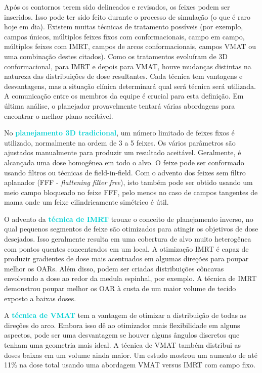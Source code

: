 \documentclass[11pt,a4paper]{article}
\newcounter{exemplo}
\begin{document}
	Após os contornos terem sido delineados e revisados, os feixes podem ser inseridos. Isso pode ter sido feito durante o processo de simulação (o que é raro hoje em dia). Existem muitas técnicas de tratamento possíveis (por exemplo, campos únicos, múltiplos feixes fixos com conformacionais, campo em campo, múltiplos feixes com IMRT, campos de arcos conformacionais, campos VMAT ou uma combinação destes citados). Como os tratamentos evoluíram de 3D conformacional, para IMRT e depois para VMAT, houve mudanças distintas na natureza das distribuições de dose resultantes. Cada técnica tem vantagens e desvantagens, mas a situação clínica determinará qual será técnica será utilizada. A comunicação entre os membros da equipe é crucial para esta definição. Em última análise, o planejador provavelmente tentará várias abordagens para encontrar o melhor plano aceitável.

	No \textcolor{DarkTurquoise}{\textbf{planejamento 3D tradicional}}, um número limitado de feixes fixos é utilizado, normalmente na ordem de 3 a 5 feixes. Os vários parâmetros são ajustados manualmente para produzir um resultado aceitável. Geralmente, é alcançada uma dose homogênea em todo o alvo. O feixe pode ser conformado usando filtros ou técnicas de field-in-field. Com o advento dos feixes sem filtro aplanador (FFF - \textit{ flattening filter free}), isto também pode ser obtido usando um meio campo bloqueado no feixe FFF, pelo menos no caso de campos tangentes de mama onde um feixe cilindricamente simétrico é útil.

	O advento da \textcolor{DarkTurquoise}{\textbf{técnica de IMRT}} trouxe o conceito de planejamento inverso, no qual pequenos segmentos de feixe são otimizados para atingir os objetivos de dose desejados. Isso geralmente resulta em uma cobertura de alvo muito heterogênea com pontos quentes concentrados em um local. A otimização IMRT é capaz de produzir gradientes de dose mais acentuados em algumas direções para poupar melhor os OARs. Além disso, podem ser criadas distribuições côncavas envolvendo a dose ao redor da medula espinhal, por exemplo. A técnica de IMRT demonstrou poupar melhor os OAR à custa de um maior volume de tecido exposto a baixas doses.

	A \textcolor{DarkTurquoise}{\textbf{técnica de VMAT}} tem a vantagem de otimizar a distribuição de todas as direções do arco. Embora isso dê ao otimizador mais flexibilidade em alguns aspectos, pode ser uma desvantagem se houver alguns ângulos discretos que tenham uma geometria mais ideal. A técnica de VMAT também distribui as doses baixas em um volume ainda maior. Um estudo mostrou um aumento de até 11\% na dose total usando uma abordagem VMAT versus IMRT com campo fixo.
\end{document}
